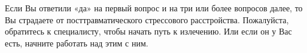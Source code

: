 \documentclass[a4paper,12pt]{article}
\begin{document}
\begin{flushleft}
Если Вы ответили «да» на первый вопрос и на три или более вопросов
далее, то Вы страдаете от посттравматического стрессового расстройства.
Пожалуйста, обратитесь к специалисту, чтобы начать путь к излечению. Или
если он у Вас есть, начните работать над этим с ним.
\end{flushleft}

\end{document}
